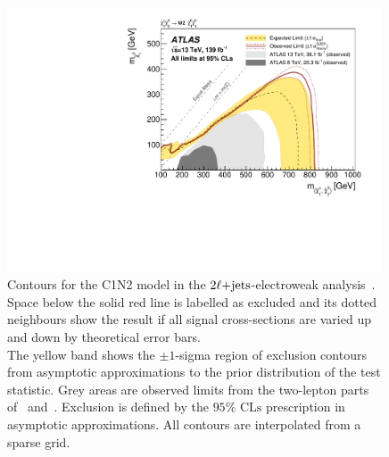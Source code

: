 
\begin{figure}[tp]
\centering
\includegraphics[width=0.99\textwidth]{figures/2ljets_contours_c1n2.pdf}
\caption{%
Contours for the C1N2 model in the $2\ell\mathrm{+jets}$-electroweak
analysis~\cite{atlas2022searches}.
\\[0.5em]
Space below the solid red line is labelled as excluded and its dotted
neighbours show the result if all signal cross-sections are varied up and down
by theoretical error bars.
\\[0.5em]
The yellow band shows the $\pm1$-sigma region of exclusion contours
from asymptotic approximations to the prior distribution of the test statistic.
Grey areas are observed limits from the two-lepton parts
of~\cite{atlas_23l_SUSY_2016_24} and~\cite{atlas_2l_SUSY_2013_11}.
Exclusion is defined by the $95\%$ $\mathrm{CLs}$ prescription
in asymptotic approximations.
All contours are interpolated from a sparse grid.
}
\label{fig:2ljets_contours_c1n2}
\end{figure}

